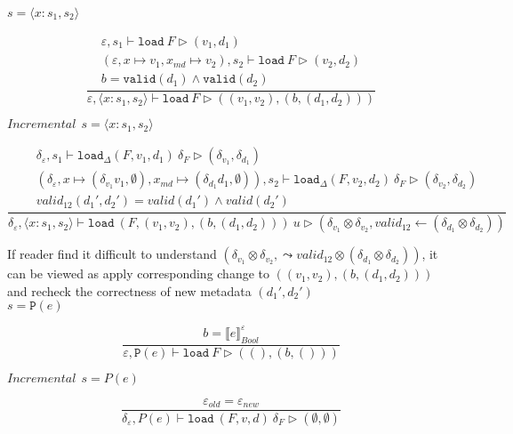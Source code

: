 \documentclass[10pt,twoside,a4paper]{article}
\theoremstyle{theorem}
\theoremstyle{lemma}
\theoremstyle{property}
\theoremstyle{definition}
\theoremstyle{assumption}
\begin{document}
$\boxed{s = \langle x : s_1, s_2 \rangle}$

\begin{displaymath}
	\frac{\begin{array}{c}
		\varepsilon, s_1 \vdash \mathtt{load}~F \rhd (v_1,d_1)\\
		(\varepsilon, x \mapsto v_1, x_{md} \mapsto v_2), s_2 \vdash \mathtt{load}~F \rhd (v_2,d_2)\\
		b = \mathtt{valid}(d_1) \land \mathtt{valid}(d_2)
	\end{array}}
	{\varepsilon, \langle x : s_1, s_2 \rangle \vdash \mathtt{load}~F \rhd ((v_1, v_2),(b,(d_1,d_2))) }
\end{displaymath}

$\boxed{Incremental~~s = \langle x : s_1, s_2 \rangle}$

\begin{displaymath}
	\frac{\begin{array}{c}
		\delta_\varepsilon, s_1 \vdash \mathtt{load}_\Delta (F,v_1,d_1)~ \delta_F \rhd (\delta_{v_1},\delta_{d_1})\\
		(\delta_\varepsilon, x \mapsto (\delta_{v_1} v_1, \emptyset), x_{md} \mapsto (\delta_{d_1} d_1, \emptyset)), s_2 \vdash \mathtt{load}_\Delta (F,v_2,d_2)~ \delta_F \rhd (\delta_{v_2},\delta_{d_2})\\
		valid_{12}({d_1}',{d_2}') = valid({d_1}') \wedge valid({d_2}')
	\end{array}}
	{\delta_\varepsilon, \langle x:s_1,s_2 \rangle \vdash \mathtt{load}~ (F,(v_1,v_2),(b,(d_1,d_2)))~ u \rhd (\delta_{v_1} \otimes \delta_{v_2},valid_{12} \leftarrow (\delta_{d_1} \otimes \delta_{d_2})) }
\end{displaymath}

If reader find it difficult to understand $(\delta_{v_1} \otimes \delta_{v_2},\leadsto valid_{12} \otimes (\delta_{d_1} \otimes \delta_{d_2}))$, it can be viewed as apply corresponding change to $((v_1,v_2),(b,(d_1,d_2)))$ and recheck the correctness of new metadata $({d_1}', {d_2}')$\\

$\boxed{s = \mathtt{P}(e)}$

\begin{displaymath}
	\frac
	{b = \llbracket e \rrbracket^{\varepsilon}_{Bool}}
	{\varepsilon, \mathtt{P}(e) \vdash \mathtt{load}~F \rhd ((),(b,()))}
\end{displaymath}

$\boxed{Incremental~~s = P(e)}$

\begin{displaymath}
	\frac{ \varepsilon_{old} = \varepsilon_{new}}
	{\delta_\varepsilon, P(e) \vdash \mathtt{load}~ (F,v,d) ~\delta_F \rhd (\emptyset, \emptyset)}
\end{displaymath}
\end{document}
